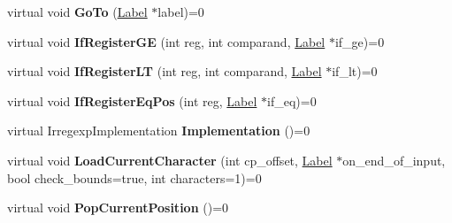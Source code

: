 \begin{DoxyCompactItemize}
\item 
virtual void {\bfseries Go\+To} (\hyperlink{classv8_1_1internal_1_1_label}{Label} $\ast$label)=0\hypertarget{classv8_1_1internal_1_1_reg_exp_macro_assembler_ae917b8d08e28a52204d8e3cfb65ae21e}{}\label{classv8_1_1internal_1_1_reg_exp_macro_assembler_ae917b8d08e28a52204d8e3cfb65ae21e}

\item 
virtual void {\bfseries If\+Register\+GE} (int reg, int comparand, \hyperlink{classv8_1_1internal_1_1_label}{Label} $\ast$if\+\_\+ge)=0\hypertarget{classv8_1_1internal_1_1_reg_exp_macro_assembler_af9c100b024fc5106d78164a6ad832581}{}\label{classv8_1_1internal_1_1_reg_exp_macro_assembler_af9c100b024fc5106d78164a6ad832581}

\item 
virtual void {\bfseries If\+Register\+LT} (int reg, int comparand, \hyperlink{classv8_1_1internal_1_1_label}{Label} $\ast$if\+\_\+lt)=0\hypertarget{classv8_1_1internal_1_1_reg_exp_macro_assembler_a903c065fc63c4c470c3fab190f732691}{}\label{classv8_1_1internal_1_1_reg_exp_macro_assembler_a903c065fc63c4c470c3fab190f732691}

\item 
virtual void {\bfseries If\+Register\+Eq\+Pos} (int reg, \hyperlink{classv8_1_1internal_1_1_label}{Label} $\ast$if\+\_\+eq)=0\hypertarget{classv8_1_1internal_1_1_reg_exp_macro_assembler_a4097b2943c7d1e5aa0d44df625c5cdf4}{}\label{classv8_1_1internal_1_1_reg_exp_macro_assembler_a4097b2943c7d1e5aa0d44df625c5cdf4}

\item 
virtual Irregexp\+Implementation {\bfseries Implementation} ()=0\hypertarget{classv8_1_1internal_1_1_reg_exp_macro_assembler_a95d43ccae92f8edbd7cfb002360fd151}{}\label{classv8_1_1internal_1_1_reg_exp_macro_assembler_a95d43ccae92f8edbd7cfb002360fd151}

\item 
virtual void {\bfseries Load\+Current\+Character} (int cp\+\_\+offset, \hyperlink{classv8_1_1internal_1_1_label}{Label} $\ast$on\+\_\+end\+\_\+of\+\_\+input, bool check\+\_\+bounds=true, int characters=1)=0\hypertarget{classv8_1_1internal_1_1_reg_exp_macro_assembler_a19c605442aa08ffb088368a98fed0243}{}\label{classv8_1_1internal_1_1_reg_exp_macro_assembler_a19c605442aa08ffb088368a98fed0243}

\item 
virtual void {\bfseries Pop\+Current\+Position} ()=0\hypertarget{classv8_1_1internal_1_1_reg_exp_macro_assembler_ad2077cab7ae1f13f8d8be972afd6e220}{}\label{classv8_1_1internal_1_1_reg_exp_macro_assembler_ad2077cab7ae1f13f8d8be972afd6e220}


\end{DoxyCompactItemize}
